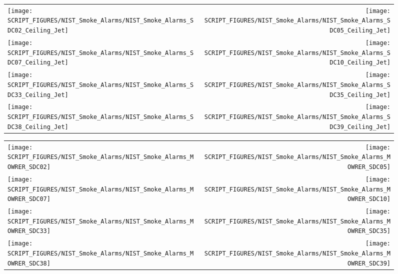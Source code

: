 \begin{figure}[!ht]
\begin{tabular*}{\textwidth}{l@{\extracolsep{\fill}}r}
\texttt{[image: SCRIPT\_FIGURES/NIST\_Smoke\_Alarms/NIST\_Smoke\_Alarms\_SDC02\_Ceiling\_Jet]} &
\texttt{[image: SCRIPT\_FIGURES/NIST\_Smoke\_Alarms/NIST\_Smoke\_Alarms\_SDC05\_Ceiling\_Jet]} \\
\texttt{[image: SCRIPT\_FIGURES/NIST\_Smoke\_Alarms/NIST\_Smoke\_Alarms\_SDC07\_Ceiling\_Jet]} &
\texttt{[image: SCRIPT\_FIGURES/NIST\_Smoke\_Alarms/NIST\_Smoke\_Alarms\_SDC10\_Ceiling\_Jet]} \\
\texttt{[image: SCRIPT\_FIGURES/NIST\_Smoke\_Alarms/NIST\_Smoke\_Alarms\_SDC33\_Ceiling\_Jet]} &
\texttt{[image: SCRIPT\_FIGURES/NIST\_Smoke\_Alarms/NIST\_Smoke\_Alarms\_SDC35\_Ceiling\_Jet]} \\
\texttt{[image: SCRIPT\_FIGURES/NIST\_Smoke\_Alarms/NIST\_Smoke\_Alarms\_SDC38\_Ceiling\_Jet]} &
\texttt{[image: SCRIPT\_FIGURES/NIST\_Smoke\_Alarms/NIST\_Smoke\_Alarms\_SDC39\_Ceiling\_Jet]}
\end{tabular*}
\end{figure}

\begin{figure}[!ht]
\begin{tabular*}{\textwidth}{l@{\extracolsep{\fill}}r}
\texttt{[image: SCRIPT\_FIGURES/NIST\_Smoke\_Alarms/NIST\_Smoke\_Alarms\_MOWRER\_SDC02]} &
\texttt{[image: SCRIPT\_FIGURES/NIST\_Smoke\_Alarms/NIST\_Smoke\_Alarms\_MOWRER\_SDC05]} \\
\texttt{[image: SCRIPT\_FIGURES/NIST\_Smoke\_Alarms/NIST\_Smoke\_Alarms\_MOWRER\_SDC07]} &
\texttt{[image: SCRIPT\_FIGURES/NIST\_Smoke\_Alarms/NIST\_Smoke\_Alarms\_MOWRER\_SDC10]} \\
\texttt{[image: SCRIPT\_FIGURES/NIST\_Smoke\_Alarms/NIST\_Smoke\_Alarms\_MOWRER\_SDC33]} &
\texttt{[image: SCRIPT\_FIGURES/NIST\_Smoke\_Alarms/NIST\_Smoke\_Alarms\_MOWRER\_SDC35]} \\
\texttt{[image: SCRIPT\_FIGURES/NIST\_Smoke\_Alarms/NIST\_Smoke\_Alarms\_MOWRER\_SDC38]} &
\texttt{[image: SCRIPT\_FIGURES/NIST\_Smoke\_Alarms/NIST\_Smoke\_Alarms\_MOWRER\_SDC39]}
\end{tabular*}
\end{figure}

